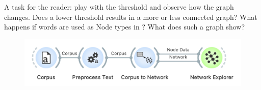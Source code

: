A task for the reader: play with the threshold and observe how the graph changes. Does a lower threshold results in a more or less connected graph? What happens if words are used as Node types in ? What does such a graph show?

\begin{figure}[h]
    \centering
    \includegraphics[width=\linewidth]{workflow.png}
    \caption{$\;$}
\end{figure}
